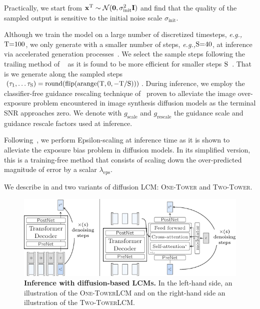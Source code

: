 \documentclass[twoside,11pt]{fairmeta}
\newcommand{\lcm}{\textsc{LCM}\xspace}
\newcommand{\lcms}{\textsc{LCMs}\xspace}
\newcommand{\twotower}{\textsc{Two-Tower}\xspace}
\newcommand{\interleaved}{\textsc{One-Tower}\xspace}
\newcommand{\diffx}[2]{\rvx^{#1}_{#2}}
\newcommand{\sigmainit}{\sigma_\text{init}}
\newcommand{\guidance}{g_\text{scale}}
\newcommand{\rsguidance}{g_\text{rescale}}
\newcommand{\epscaling}{\lambda_\text{eps}}
\newcommand{\eg}{\textit{e.g.,}\xspace}
\newcommand{\gaussian}{\mathcal{N}}
\def\rS{{\textnormal{S}}}
\def\rT{{\textnormal{T}}}
\def\rvx{{\mathbf{x}}}
\def\rvzero{{\mathbf{0}}}
\def\rmI{{\mathbf{I}}}
\begin{document}
Practically, we start from $\diffx{\rT}{} \sim\gaussian(\rvzero, \sigmainit^2\rmI)$ and find that the quality of the sampled output is sensitive to the initial noise scale $\sigmainit$. 

Although we train the model on a large number of discretized timesteps, \eg $\rT{=}100$, we only generate with a smaller number of steps, \eg $\rS{=}40$, at inference via accelerated generation processes~\citep{DDIM}. We select the sample steps following the trailing method of ~\citet{lu2022dpm} as it is found to be more efficient for smaller steps $\rS$~\citep{lin2024common}. That is we generate along the sampled steps
$(\tau_1, \ldots \tau_\rS)= \textrm{round}(\textrm{flip}(\textrm{arange}(\rT, 0, -\rT/\rS)))$.
During inference, we employ the classifier-free guidance rescaling technique of~\citet{lin2024common} proven to alleviate the image over-exposure problem encountered in image synthesis diffusion models as the terminal SNR approaches zero. We denote with $\guidance$ and $\rsguidance$ the guidance scale and guidance rescale factors used at inference.

Following~\citet{ning2023elucidating}, we perform Epsilon-scaling at inference time as it is shown to alleviate the exposure bias problem in diffusion models. In its simplified version, this is a training-free method that consists of scaling down the over-predicted magnitude of error by a scalar $\epscaling$.




We describe in  and  two variants of diffusion \lcm: \interleaved and \twotower.

\begin{figure}[!htb]
    \centering
    \includegraphics[width=.9\linewidth]{interleaved_and_two_tower.pdf}
    \caption{\textbf{Inference with diffusion-based \lcms.} In the left-hand side, an illustration of the \interleaved \lcm and on the right-hand side an illustration of the \twotower \lcm.
    }
    \label{fig:archi:difflcm}
\end{figure}
\end{document}
